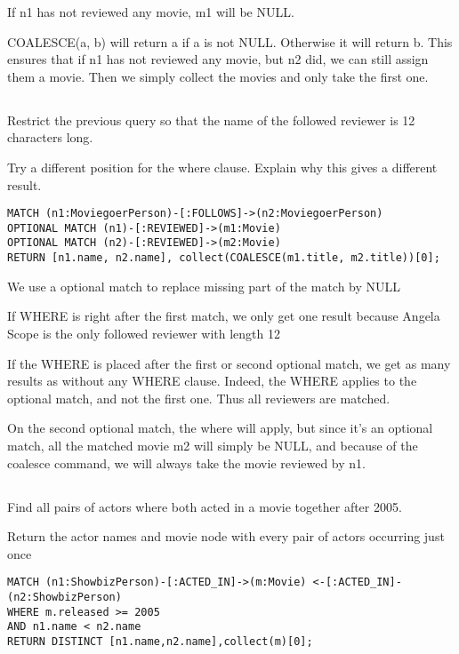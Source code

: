 If n1 has not reviewed any movie, m1 will be NULL.

COALESCE(a, b) will return a if a is not NULL. Otherwise it will return b. This ensures that if n1 has not reviewed any movie, but n2 did, we can still assign them a movie. Then we simply collect the movies and only take the first one.

\subsection{}
Restrict the previous query so that the name of the followed reviewer is 12 characters long.

Try a different position for the where clause. Explain why this gives a different result.

\begin{verbatim}
MATCH (n1:MoviegoerPerson)-[:FOLLOWS]->(n2:MoviegoerPerson)
OPTIONAL MATCH (n1)-[:REVIEWED]->(m1:Movie)
OPTIONAL MATCH (n2)-[:REVIEWED]->(m2:Movie)
RETURN [n1.name, n2.name], collect(COALESCE(m1.title, m2.title))[0];
\end{verbatim}

We use a optional match to replace missing part of the match by NULL

If WHERE is right after the first match, we only get one result because Angela Scope is the only followed reviewer with length 12

If the WHERE is placed after the first or second optional match, we get as many results as without any WHERE clause. Indeed, the WHERE applies to the optional match, and not the first one. Thus all reviewers are matched.

On the second optional match, the where will apply, but since it's an optional match, all the matched movie m2 will simply be NULL, and because of the coalesce command, we will always take the movie reviewed by n1.

\subsection{}
Find all pairs of actors where both acted in a movie together after 2005.

Return the actor names and movie node with every pair of actors occurring just once

\begin{verbatim}
MATCH (n1:ShowbizPerson)-[:ACTED_IN]->(m:Movie) <-[:ACTED_IN]-(n2:ShowbizPerson)
WHERE m.released >= 2005
AND n1.name < n2.name
RETURN DISTINCT [n1.name,n2.name],collect(m)[0];
\end{verbatim}

